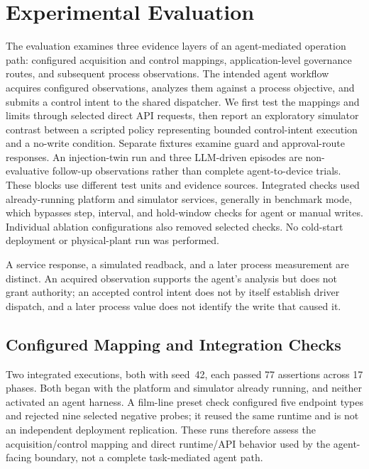 \documentclass[journal]{IEEEtran}
\begin{document}
  \section{Experimental Evaluation}
\label{sec:eval}
The evaluation examines three evidence layers of an agent-mediated operation path: configured acquisition and control mappings, application-level governance routes, and subsequent process observations. The intended agent workflow acquires configured observations, analyzes them against a process objective, and submits a control intent to the shared dispatcher. We first test the mappings and limits through selected direct API requests, then report an exploratory simulator contrast between a scripted policy representing bounded control-intent execution and a no-write condition. Separate fixtures examine guard and approval-route responses. An injection-twin run and three LLM-driven episodes are non-evaluative follow-up observations rather than complete agent-to-device trials. These blocks use different test units and evidence sources. Integrated checks used already-running platform and simulator services, generally in benchmark mode, which bypasses step, interval, and hold-window checks for agent or manual writes. Individual ablation configurations also removed selected checks. No cold-start deployment or physical-plant run was performed.

A service response, a simulated readback, and a later process measurement are distinct. An acquired observation supports the agent's analysis but does not grant authority; an accepted control intent does not by itself establish driver dispatch, and a later process value does not identify the write that caused it.

\subsection{Configured Mapping and Integration Checks}
\label{sec:eval-mapping}
Two integrated executions, both with seed~42, each passed 77 assertions across 17 phases. Both began with the platform and simulator already running, and neither activated an agent harness. A film-line preset check configured five endpoint types and rejected nine selected negative probes; it reused the same runtime and is not an independent deployment replication. These runs therefore assess the acquisition/control mapping and direct runtime/API behavior used by the agent-facing boundary, not a complete task-mediated agent path.
\end{document}
